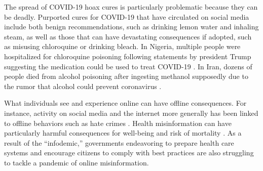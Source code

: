 \documentclass[letterpaper, 12pt, parskip=full,DIV=10]{scrartcl}
\begin{document}
The spread of COVID-19 hoax cures is particularly problematic because they can be deadly. Purported cures for COVID-19 that have circulated on social media include both benign recommendations, such as drinking lemon water and inhaling steam, as well as those that can have devastating consequences if adopted, such as misusing chloroquine or drinking bleach. In Nigeria, multiple people were hospitalized for chloroquine poisoning following statements by president Trump suggesting the medication could be used to treat COVID-19 \citep{busari2020nigeria}. In Iran, dozens of people died from alcohol poisoning after ingesting methanol supposedly due to the rumor that alcohol could prevent coronavirus \citep{haghdoost2020alcohol}. 

What individuals see and experience online can have offline consequences. For instance, activity on social media and the internet more generally has been linked to offline behaviors such as hate crimes \citep{muller2019fanning, chan2016internet}. Health misinformation can have particularly harmful consequences for well-being and risk of mortality \citep{swire2020public}. As a result of the ``infodemic,'' governments endeavoring to prepare health care systems and encourage citizens to comply with best practices are also struggling to tackle a pandemic of online misinformation.
\end{document}
